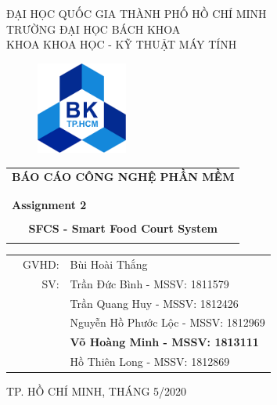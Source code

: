 

\begin{center}
ĐẠI HỌC QUỐC GIA THÀNH PHỐ HỒ CHÍ MINH \\
TRƯỜNG ĐẠI HỌC BÁCH KHOA \\
KHOA KHOA HỌC - KỸ THUẬT MÁY TÍNH 
\end{center}

\vspace{1cm}

\begin{figure}[H]
\begin{center}
\includegraphics[width=3cm]{hcmut.png}
\end{center}
\end{figure}

\vspace{1cm}


\begin{center}
\begin{tabular}{c}
    \multicolumn{1}{l}{\textbf{{\Large BÁO CÁO CÔNG NGHỆ PHẦN MỀM}}} 
\\
\\
\hline
\\
\multicolumn{1}{l}{\textbf{{\Large Assignment 2}}}\\
\\
\textbf{{\Huge  SFCS - Smart Food Court System}}\\
\\
\hline
\end{tabular}
\end{center}

\vspace{3cm}

\begin{table}[h]
\begin{tabular}{rrl}
\hspace{5 cm} & GVHD: & Bùi Hoài Thắng\\
& SV: & Trần Đức Bình - MSSV: 1811579\\
&& Trần Quang Huy - MSSV: 1812426\\
&& Nguyễn Hồ Phước Lộc - MSSV: 1812969\\
&& \textbf{Võ Hoàng Minh - MSSV: 1813111} \\
&& Hồ Thiên Long - MSSV: 1812869 \\
\end{tabular}
\end{table}

\begin{center}
{\footnotesize TP. HỒ CHÍ MINH, THÁNG 5/2020}
\end{center}
